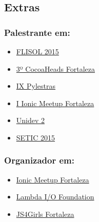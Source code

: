 \documentclass[]{article}
\providecommand{\tightlist}{%
  \setlength{\itemsep}{0pt}\setlength{\parskip}{0pt}}
\begin{document}
\subsection{Extras}\label{extras}

\subsubsection{Palestrante em:}\label{palestrante-em}

\begin{itemize}
\tightlist
\item
  \href{http://flisolce.org/}{FLISOL 2015}
\item
  \href{http://www.cocoaheads.com.br/agendas/detalhes/79/}{3º CocoaHeads
  Fortaleza}
\item
  \href{http://pylestras.org/evento/ix-pylestras/}{IX Pylestras}
\item
  \href{http://www.meetup.com/pt/Ionic-Ceara/events/224620543/}{I Ionic
  Meetup Fortaleza}
\item
  \href{http://unidevce.github.io/}{Unidev 2}
\item
  \href{http://www.seti.ufc.br/}{SETIC 2015}
\end{itemize}

\subsubsection{Organizador em:}\label{organizador-em}

\begin{itemize}
\tightlist
\item
  \href{http://ionicbrazil.com/}{Ionic Meetup Fortaleza}
\item
  \href{https://github.com/lambda-io}{Lambda I/O Foundation}
\item
  \href{http://js4girls-fortaleza.github.io/}{JS4Girls Fortaleza}
\end{itemize}
\end{document}
